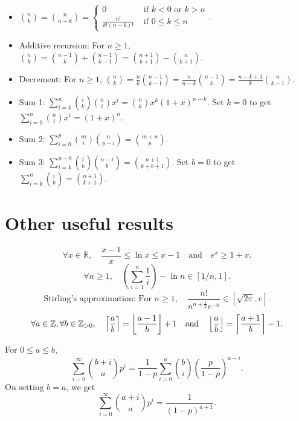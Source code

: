 \documentclass[a4paper, 12pt, fleqn]{article}
\begin{document}
\begin{itemize}
\item $\displaystyle \binom{n}{k} = \binom{n}{n-k} = \begin{cases}
    0 & \textrm{ if } k < 0 \textrm{ or } k > n
    \\ \frac{n!}{k!(n-k)!} & \textrm{ if } 0 \le k \le n \end{cases}$.
\item Additive recursion: For $n \ge 1$, $\displaystyle \binom{n}{k}
    = \binom{n-1}{k} + \binom{n-1}{k-1}
    = \binom{n+1}{k+1} - \binom{n}{k+1}$.
\item Decrement: For $n \ge 1$, $\displaystyle \binom{n}{k}
    = \frac{n}{k} \binom{n-1}{k-1}
    = \frac{n}{n-k} \binom{n-1}{k}
    = \frac{n-k+1}{k} \binom{n}{k-1}$.
\item Sum 1: $\displaystyle \sum_{i=k}^n \binom{i}{k}\binom{n}{i}x^i = \binom{n}{k}x^k(1+x)^{n-k}$.
Set $k=0$ to get $\displaystyle \sum_{i=0}^n \binom{n}{i}x^i = (1+x)^n$.
\item Sum 2: $\displaystyle \sum_{i=0}^p \binom{m}{i}\binom{n}{p-i} = \binom{m+n}{p}$.
\item Sum 3: $\displaystyle \sum_{i=k}^{n-b} \binom{i}{k}\binom{n-i}{b} = \binom{n+1}{k+b+1}$.
Set $b=0$ to get $\displaystyle \sum_{i=k}^{n} \binom{i}{k} = \binom{n+1}{k+1}$.
\end{itemize}

\section{Other useful results}

\[ \forall x \in \mathbb{R},\quad \frac{x-1}{x} \le \ln x \le x-1 \quad\textrm{and}\quad e^x \ge 1 + x. \]
\[ \forall n \ge 1, \quad \left(\sum_{i=1}^n \frac{1}{i}\right) - \ln n \in [1/n, 1]. \]
\[ \textrm{Stirling's approximation: For } n \ge 1,\quad
    \frac{n!}{n^{n+\frac{1}{2}}e^{-n}} \in [\sqrt{2\pi}, e]. \]
\[ \forall a \in \mathbb{\mathbb{Z}}, \forall b \in \mathbb{Z}_{>0},\quad
    \left\lceil \frac{a}{b} \right\rceil = \left\lfloor \frac{a-1}{b} \right\rfloor+1 \quad\textrm{and}\quad
    \left\lfloor \frac{a}{b} \right\rfloor = \left\lceil \frac{a+1}{b} \right\rceil-1. \]

\begin{theorem}
For $0 \le a \le b$,
\[ \sum_{i=0}^{\infty} \binom{b+i}{a}p^i
    = \frac{1}{1-p}\sum_{i=0}^a \binom{b}{i}\left(\frac{p}{1-p}\right)^{a-i}. \]
On setting $b = a$, we get
\[ \sum_{i=0}^{\infty} \binom{a+i}{a}p^i = \frac{1}{(1-p)^{a+1}}. \]
\end{theorem}

\end{document}
